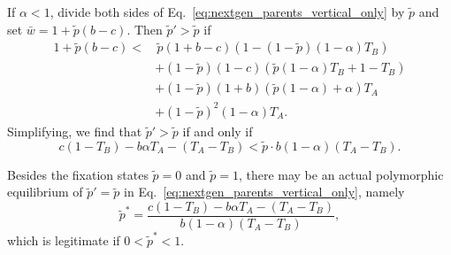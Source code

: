 \documentclass[12pt]{extarticle}
\begin{document}
{If $\alpha<1$, divide both sides of Eq.\ \ref{eq:nextgen_parents_vertical_only} by $\tilde{p}$ and set $\bar{w} = 1 + \tilde{p}(b-c)$. Then $\tilde{p}'>\tilde{p}$ if
\begin{equation}
\begin{aligned} 
  1 + \tilde{p}(b-c) < 
  & \, \tilde{p}(1+b-c) (1 - (1-\tilde{p}) (1-\alpha) T_B) \\
  & + (1-\tilde{p}) (1-c) (\tilde{p} (1-\alpha) T_B + 1 - T_B) \\
  & + (1-\tilde{p}) (1+b) (\tilde{p} (1-\alpha) + \alpha) T_A \\
  & + (1-\tilde{p})^2 (1-\alpha) T_A .
\end{aligned}
\end{equation}
Simplifying, we find that $\tilde{p}'>\tilde{p}$ if and only if
\begin{equation} \label{eq:vert_hori_global_condition}
c(1-T_B) - b \alpha T_A - (T_A-T_B) < \tilde{p} \cdot b (1-\alpha) (T_A-T_B).
\end{equation}

Besides the fixation states $\tilde{p}=0$ and $\tilde{p}=1$, there may be an actual polymorphic equilibrium of $\tilde{p}'=\tilde{p}$ in Eq.\ \ref{eq:nextgen_parents_vertical_only}, namely 
\begin{equation} \label{eq:vert_hori_equilibrium}
  \tilde{p}^* = 
  \frac{c(1-T_B) - b \alpha T_A - (T_A-T_B)}{b (1-\alpha) (T_A-T_B)} ,
\end{equation} 
which is legitimate if $0<\tilde{p}^*<1$.

}
\end{document}
